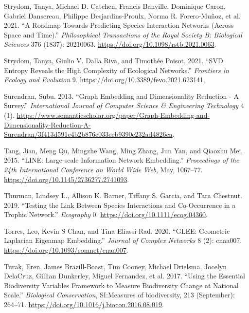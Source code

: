\documentclass[
  letterpaper,
  DIV=11,
  numbers=noendperiod]{scrartcl}
\newlength{\cslhangindent}
\newlength{\cslentryspacingunit} %
\newenvironment{CSLReferences}[2] %
 {%
  \setlength{\parindent}{0pt}
  \ifodd #1
  \let\oldpar\par
  \def\par{\hangindent=\cslhangindent\oldpar}
  \fi
  \setlength{\parskip}{#2\cslentryspacingunit}
 }%
 {}
\begin{document}
\begin{CSLReferences}{1}{0}
\leavevmode{}%
Strydom, Tanya, Michael D. Catchen, Francis Banville, Dominique Caron,
Gabriel Dansereau, Philippe Desjardins-Proulx, Norma R. Forero-Muñoz, et
al. 2021. {``A Roadmap Towards Predicting Species Interaction Networks
(Across Space and Time).''} \emph{Philosophical Transactions of the
Royal Society B: Biological Sciences} 376 (1837): 20210063.
\url{https://doi.org/10.1098/rstb.2021.0063}.

\leavevmode{}%
Strydom, Tanya, Giulio V. Dalla Riva, and Timothée Poisot. 2021. {``{SVD
Entropy Reveals} the {High Complexity} of {Ecological Networks}.''}
\emph{Frontiers in Ecology and Evolution} 9.
\url{https://doi.org/10.3389/fevo.2021.623141}.

\leavevmode{}%
Surendran, Subu. 2013. {``Graph {Embedding} and {Dimensionality
Reduction} - {A Survey}.''} \emph{International Journal of Computer
Science \& Engineering Technology} 4 (1).
\url{https://www.semanticscholar.org/paper/Graph-Embedding-and-Dimensionality-Reduction-A-Surendran/3f413d591e4b2b876e033eeb9390e232ad4826ca}.

\leavevmode{}%
Tang, Jian, Meng Qu, Mingzhe Wang, Ming Zhang, Jun Yan, and Qiaozhu Mei.
2015. {``{LINE}: {Large-scale Information Network Embedding}.''}
\emph{Proceedings of the 24th International Conference on World Wide
Web}, May, 1067--77. \url{https://doi.org/10.1145/2736277.2741093}.

\leavevmode{}%
Thurman, Lindsey L., Allison K. Barner, Tiffany S. Garcia, and Tara
Chestnut. 2019. {``Testing the Link Between Species Interactions and
Co-Occurrence in a Trophic Network.''} \emph{Ecography} 0.
\url{https://doi.org/10.1111/ecog.04360}.

\leavevmode{}%
Torres, Leo, Kevin S Chan, and Tina Eliassi-Rad. 2020. {``{GLEE}:
{Geometric Laplacian Eigenmap Embedding}.''} \emph{Journal of Complex
Networks} 8 (2): cnaa007. \url{https://doi.org/10.1093/comnet/cnaa007}.

\leavevmode{}%
Turak, Eren, James Brazill-Boast, Tim Cooney, Michael Drielsma, Jocelyn
DelaCruz, Gillian Dunkerley, Miguel Fernandez, et al. 2017. {``Using the
Essential Biodiversity Variables Framework to Measure Biodiversity
Change at National Scale.''} \emph{Biological Conservation},
{SI}:{Measures} of biodiversity, 213 (September): 264--71.
\url{https://doi.org/10.1016/j.biocon.2016.08.019}.


\end{CSLReferences}
\end{document}
